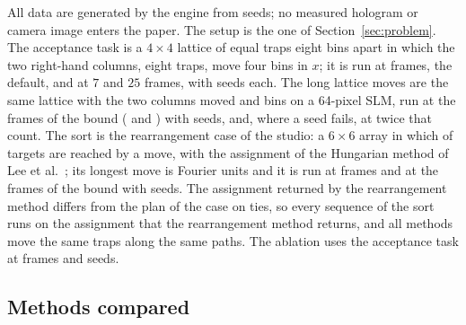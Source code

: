 All data are generated by the engine from seeds; no measured hologram or camera image enters the paper. The setup is the one of Section~\ref{sec:problem}. The acceptance task is a $4\times4$ lattice of equal traps eight bins apart in which the two right-hand columns, eight traps, move four bins in $x$; it is run at \parFrames{} frames, the default, and at $7$ and $25$ frames, with \nSeedsTwo{} seeds each. The long lattice moves are the same lattice with the two columns moved \longABins{} and \longBBins{} bins on a 64-pixel SLM, run at the frames of the bound (\longAFrames{} and \longBFrames{}) with \longSeeds{} seeds, and, where a seed fails, at twice that count. The sort is the rearrangement case of the studio: a $6\times6$ array in which \cTenMoving{} of \cTenTraps{} targets are reached by a move, with the assignment of the Hungarian method of Lee et al.~\cite{lee2017}; its longest move is \cTenFu{} Fourier units and it is run at \cTenEqual{} frames and at the \cTenFrames{} frames of the bound with \cTenSeeds{} seeds. The assignment returned by the rearrangement method differs from the plan of the case on ties, so every sequence of the sort runs on the assignment that the rearrangement method returns, and all methods move the same traps along the same paths. The ablation uses the acceptance task at \parFrames{} frames and \ablTN{} seeds.

\subsection{Methods compared}

